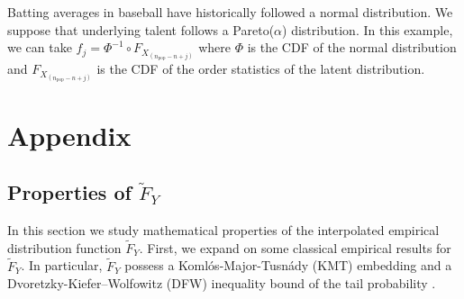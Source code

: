 \documentclass[11pt]{article}
\newcommand{\npop}{n_{\text{pop}}}
\newcommand{\nsys}{n}
\begin{document}




Batting averages in baseball have historically followed a normal distribution. 
We suppose that underlying talent follows a Pareto($\alpha$) distribution. 
In this example, we can take $f_j = \Phi^{-1} \circ F_{X_{(\npop - \nsys + j)}}$ where $\Phi$ is the CDF of the normal distribution and $F_{X_{(\npop - \nsys + j)}}$ is the CDF of the order statistics of the latent distribution. 



\section*{Appendix}

\subsection*{Properties of $\widetilde F_Y$}

In this section we study mathematical properties of the interpolated empirical distribution function $\widetilde F_Y$. First, we expand on some classical empirical results for $\widetilde F_Y$. In particular, $\widetilde F_Y$ possess a Koml{\'o}s-Major-Tusn{\'a}dy (KMT) embedding \citep{komlos1975approximation} and a Dvoretzky-Kiefer–Wolfowitz (DFW) inequality bound of the tail probability \citep{dvoretzky1956asymptotic, massart1990tight}. 
\end{document}
